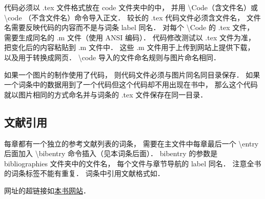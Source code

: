 代码必须以  .tex 文件格式放在 code 文件夹中的中， 并用 \textbackslash Code（含文件名）或  \textbackslash code （不含文件名）命令导入正文． 较长的 .tex 代码文件必须含文件名， 文件名需要反映代码的内容而不是与词条 label 同名． 对每个 \textbackslash Code 的 .tex 文件， 需要生成同名的 .m 文件（使用 ANSI 编码）． 代码修改测试以 .tex 文件为准， 把变化后的内容粘贴到 .m 文件中． 这些 .m 文件用于上传到网站上提供下载， 以及用于转换成网页． \textbackslash code 导入的文件命名规则与图片命名相同．

如果一个图片的制作使用了代码， 则代码文件必须与图片同名同目录保存． 如果一个词条中的数据用到了一个代码但这个代码却不用出现在书中， 那么这个代码就以图片相同的方式命名并与词条的 .tex 文件保存在同一目录． 


\subsection{文献引用}
每章都有一个独立的参考文献列表的词条， 需要在主文件中每章最后一个 \textbackslash entry 后面加入 \textbackslash bibentry 命令插入（见本词条后面）． bibentry 的参数是 bibliographies 文件夹中的文件名， 每个文件与章节导航的 label 同名． 注意全书的词条标签不能有重复． 词条中引用文献格式如\cite{PhysWiki}\cite{PhysWikiEng}．

网址的超链接如\href{http://littleshi.cn}{\color{blue}本书网站}．

